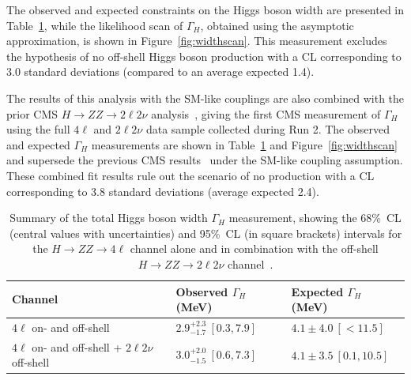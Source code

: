 The observed and expected constraints on the Higgs boson width are presented in Table~\ref{table:widthoffshellcomb}, while the likelihood scan of $\Gamma_H$, obtained using the asymptotic approximation, is shown in Figure~\ref{fig:widthscan}. This measurement excludes the hypothesis of no off-shell Higgs boson production with a CL corresponding to 3.0 standard deviations (compared to an average expected 1.4).

The results of this analysis with the SM-like couplings are also combined with the prior CMS \offshell $H\to ZZ\to2\ell2\nu$ analysis~\cite{CMS:2022ley}, giving the first CMS measurement of $\Gamma_H$ using the full $4\ell$ and $2\ell2\nu$ data sample collected during Run 2. 
The observed and expected $\Gamma_H$ measurements are shown in Table~\ref{table:widthoffshellcomb} and Figure~\ref{fig:widthscan} and supersede the previous CMS results~\cite{CMS:2022ley} under the SM-like coupling assumption. These combined fit results rule out the scenario of no \offshell \Hboson production
with a CL corresponding to 3.8 standard deviations (average expected 2.4).

\begin{table}[!htb]
    \centering
    \begin{tabular}{lll}
        Channel     & Observed $\Gamma_H$ (MeV)        &  Expected $\Gamma_H$ (MeV)  \\
        \hline
        $4\ell$ on- and off-shell    & $2.9^{+2.3}_{-1.7} \ [0.3,7.9]$ & $4.1\pm 4.0 \ [<11.5 ]$ \\
        $4\ell$ on- and off-shell  + $2\ell2\nu$ off-shell  & $3.0^{+ 2.0 }_{- 1.5 }  \ [0.6, 7.3]$ & $4.1\pm3.5 \ [0.1,10.5]$ \\
    \end{tabular}
    \caption{Summary of the total Higgs boson width $\Gamma_H$ measurement, showing the 68\%~CL (central values with uncertainties)
    and 95\%~CL (in square brackets) intervals for the $H \to ZZ \to 4 \ell$ channel alone and in combination with the off-shell $H \to ZZ \to 2 \ell 2 \nu$ channel~\cite{PhysRevD.111.092014}.}
    \label{table:widthoffshellcomb}
\end{table}

